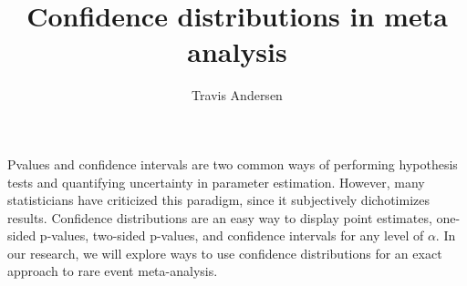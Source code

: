 \documentclass{article}
\title{Confidence distributions in meta analysis}
\author{Travis Andersen}
\begin{document}
\maketitle  

P\hyph{}values and confidence intervals are two common ways of performing hypothesis tests and quantifying uncertainty in parameter estimation. However, many statisticians have criticized this paradigm, since it subjectively dichotimizes results. Confidence distributions are an easy way to display point estimates, one-sided p-values, two-sided p-values, and confidence intervals for any level of $\alpha$. In our research, we will explore ways to use confidence distributions for an exact approach to rare event meta-analysis. 
\end{document}
